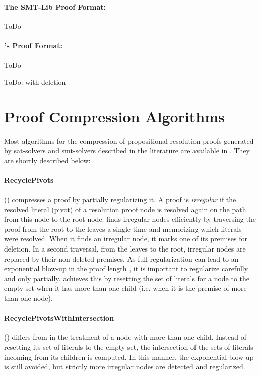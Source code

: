 \documentclass{llncs}
\begin{document}
\paragraph{The SMT-Lib Proof Format: }

{\veriT}

ToDo


\paragraph{{\skeptik}'s Proof Format: }

ToDo

ToDo: with deletion


\section{Proof Compression Algorithms}

Most algorithms for the compression of propositional resolution proofs generated by sat-solvers and smt-solvers described in the literature are available in {\skeptik}. They are shortly described below:

\paragraph{RecyclePivots} () \cite{RP08,RP11} compresses a proof by partially regularizing it. A proof is \emph{irregular} \cite{Tseitin} if the resolved literal (pivot) of a resolution proof node is resolved again on the path from this node to the root node.  finds irregular nodes efficiently by traversing the proof from the root to the leaves a single time and memorizing which literals were resolved. When it finds an irregular node, it marks one of its premises for deletion. In a second traversal, from the leaves to the root, irregular nodes are replaced by their non-deleted premises. As full regularization can lead to an exponential blow-up in the proof length \cite{Goerdt}, it is important to regularize carefully and only partially.  achieves this by resetting the set of literals for a node to the empty set when it has more than one child (i.e. when it is the premise of more than one node).


\paragraph{RecyclePivotsWithIntersection} () \cite{LURPI}
differs from  in the treatment of a node with more than one child. Instead of resetting its set of literals to the empty set, the intersection of the sets of literals incoming from its children is computed. In this manner, the exponential blow-up is still avoided, but strictly more irregular nodes are detected and regularized.
\end{document}
